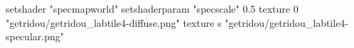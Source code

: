 setshader "specmapworld"
setshaderparam "specscale" 0.5
texture 0 "getridou/getridou_labtile4-diffuse.png"
texture s "getridou/getridou_labtile4-specular.png"